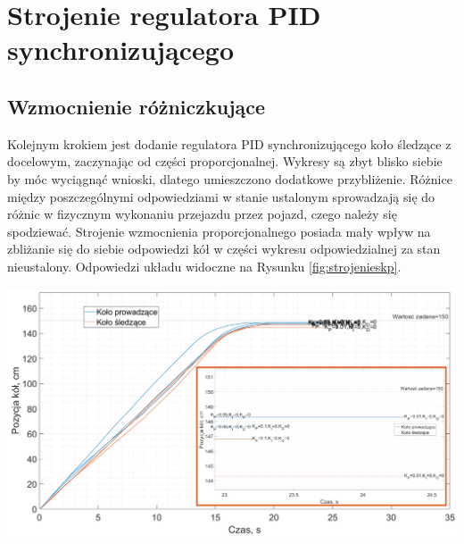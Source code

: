 \section{Strojenie regulatora PID synchronizującego}
\subsection{Wzmocnienie różniczkujące}
Kolejnym krokiem jest dodanie regulatora PID synchronizującego koło śledzące z docelowym, zaczynając od części proporcjonalnej. Wykresy są zbyt blisko siebie by móc wyciągnąć wnioski, dlatego umieszczono dodatkowe przybliżenie. Różnice między poszczególnymi odpowiedziami w stanie ustalonym sprowadzają się do różnic w fizycznym wykonaniu przejazdu przez pojazd, czego należy się spodziewać. Strojenie wzmocnienia proporcjonalnego posiada mały wpływ na zbliżanie się do siebie odpowiedzi kół w części wykresu odpowiedzialnej za stan nieustalony. Odpowiedzi układu widoczne na Rysunku \ref{fig:strojenieskp}.

\begin{center}
    \includegraphics[scale=0.37]{images/strojenieSP.png}
    \label{fig:strojenieskp}
\end{center}


